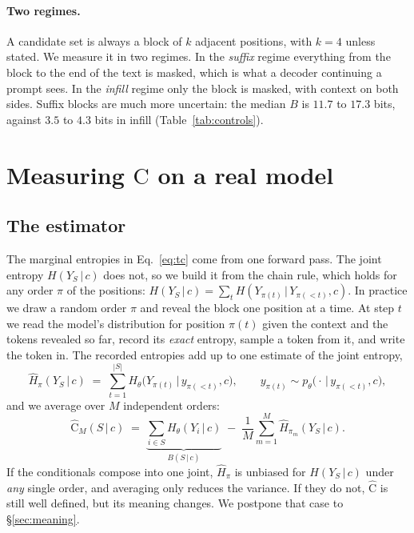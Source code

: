 \documentclass{article}
\newcommand{\C}{\mathrm{C}}
\newcommand{\given}{\,\vert\,}
\newcommand{\Chat}{\widehat{\C}}
\begin{document}
\paragraph{Two regimes.} A candidate set is always a block of $k$ adjacent positions,
with $k{=}4$ unless stated. We measure it in two regimes. In the \emph{suffix} regime
everything from the block to the end of the text is masked, which is what a decoder
continuing a prompt sees. In the \emph{infill} regime only the block is masked, with
context on both sides. Suffix blocks are much more uncertain: the median $B$ is $11.7$
to $17.3$ bits, against $3.5$ to $4.3$ bits in infill (Table~\ref{tab:controls}).

\section{Measuring $\C$ on a real model}
\label{sec:protocol}



\subsection{The estimator}
\label{sec:estimator}

The marginal entropies in Eq.~\eqref{eq:tc} come from one forward pass. The joint
entropy $H(Y_S\given c)$ does not, so we build it from the chain rule, which holds for
any order $\pi$ of the positions:
$H(Y_S\given c)=\sum_t H(Y_{\pi(t)}\given Y_{\pi(<t)},c)$. In practice we draw a random
order $\pi$ and reveal the block one position at a time. At step $t$ we read the model's
distribution for position $\pi(t)$ given the context and the tokens revealed so far,
record its \emph{exact} entropy, sample a token from it, and write the token in. The
recorded entropies add up to one estimate of the joint entropy,
\begin{equation}
  \hat H_{\pi}(Y_S\given c) \;=\; \sum_{t=1}^{|S|}
  H_\theta\!\big(Y_{\pi(t)} \given y_{\pi(<t)}, c\big),
  \qquad
  y_{\pi(t)} \sim p_\theta\!\big(\cdot \given y_{\pi(<t)}, c\big),
  \label{eq:meter}
\end{equation}
and we average over $M$ independent orders:
\begin{equation}
  \Chat_M(S\given c) \;=\; \underbrace{\sum_{i\in S} H_\theta(Y_i\given c)}_{B(S\given c)}
  \;-\; \frac{1}{M}\sum_{m=1}^{M}\hat H_{\pi_m}(Y_S\given c).
  \label{eq:chat}
\end{equation}
If the conditionals compose into one joint, $\hat H_\pi$ is unbiased for $H(Y_S\given c)$
under \emph{any} single order, and averaging only reduces the variance. If they do not,
$\Chat$ is still well defined, but its meaning changes. We postpone that case to
\S\ref{sec:meaning}.
\end{document}
